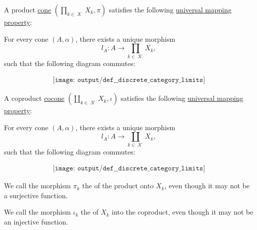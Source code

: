 \begin{definition}
  \begin{minipage}[t]{0.47\textwidth}
    A product \hyperref[def:category_of_cones/cone]{cone} \( (\prod_{k \in \mscrK} X_k, \pi) \) satisfies the following \hyperref[rem:limit_universal_mapping_property]{universal mapping property}:
    \begin{displayquote}
      For every cone \( (A, \alpha) \), there exists a unique morphism
      \begin{equation*}
        l_A: A \to \prod_{k \in \mscrK} X_k,
      \end{equation*}
      such that the following diagram commutes:
    \end{displayquote}
    \begin{equation}\label{eq:def:discrete_category_limits/product}
      \begin{aligned}
        \texttt{[image: output/def\_\_discrete\_category\_limits]}
      \end{aligned}
    \end{equation}
  \end{minipage}
  \hfill
  \begin{minipage}[t]{0.47\textwidth}
    A coproduct \hyperref[def:category_of_cones/cocone]{cocone} \( (\coprod_{k \in \mscrK} X_k, \iota) \) satisfies the following \hyperref[rem:limit_universal_mapping_property]{universal mapping property}:
    \begin{displayquote}
      For every cone \( (A, \alpha) \), there exists a unique morphism
      \begin{equation*}
        l_A: A \to \coprod_{k \in \mscrK} X_k,
      \end{equation*}
      such that the following diagram commutes:
    \end{displayquote}
    \begin{equation}\label{eq:def:discrete_category_limits/coproduct}
      \begin{aligned}
        \texttt{[image: output/def\_\_discrete\_category\_limits]}
      \end{aligned}
    \end{equation}
  \end{minipage}

  \begin{minipage}[t]{0.47\textwidth}
    We call the morphism \( \pi_k \) the  of the product onto \( X_k \), even though it may not be a surjective function.
  \end{minipage}
  \hfill
  \begin{minipage}[t]{0.47\textwidth}
    We call the morphism \( \iota_k \) the  of \( X_k \) into the coproduct, even though it may not be an injective function.
  \end{minipage}
  \medskip


\end{definition}
